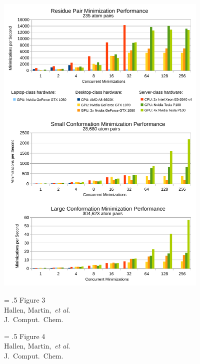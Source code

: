 \newpage

\begin{center}
\includegraphics[width=4in]{figures/gpu.pdf}
\end{center}
\vspace{0.25in}
\hspace*{3in}
{\Large
\begin{minipage}[t]{3in}
\baselineskip = .5\baselineskip
Figure 3 \\
Hallen, Martin,~\textit{et al.}\\
J.\ Comput.\ Chem.
\end{minipage}
}

\newpage

\begin{center}
{
	
}
\end{center}
\vspace{0.25in}
\hspace*{3in}
{\Large
\begin{minipage}[t]{3in}
\baselineskip = .5\baselineskip
Figure 4 \\
Hallen, Martin,~\textit{et al.}\\
J.\ Comput.\ Chem.
\end{minipage}
}

